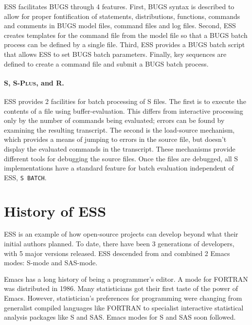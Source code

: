 \documentclass{article}
\newif\ifdraft
\newcommand*{\Splus}{\textsc{S-Plus}}
\newcommand{\stexttt}[1]{{\small\texttt{#1}}}
\newcommand{\emptyfig}{
\hspace*{42pt}\rule{324pt}{.25pt}\\
\hspace*{42pt}\rule{.25pt}{10pc}
\rule{316pt}{.25pt}
\rule{.25pt}{10pc}}
\begin{document}
ESS facilitates BUGS %
through 4 features.
First, BUGS syntax is described to allow for proper fontification
of statements, distributions, functions, commands and comments in BUGS
model files, command files and log files.  Second, ESS creates
templates for the command file from the model file so that a BUGS
batch process can be defined by a single file.  Third, ESS provides
a BUGS batch script that allows ESS to set BUGS batch parameters.
Finally, key sequences are defined to create a command file and submit 
a BUGS batch process.

\paragraph{S, \Splus, and R.}
ESS provides 2 facilities for batch processing of S files.  The first
is to execute the contents of a file using buffer-evaluation.  This
differs from interactive processing only by the number of commands
being evaluated; errors can be found by examining the resulting
transcript.  The second is the load-source mechanism, which provides a
means of jumping to errors in the source file, but doesn't display the
evaluated commands in the transcript.  These mechanisms provide
different tools for debugging the source files.  Once the files are
debugged, all S implementations have a standard feature for batch
evaluation independent of ESS, \stexttt{S BATCH}.

\section{History of ESS}
\label{sec:ESS:history}

ESS is an example of how open-source projects can develop beyond what
their initial authors planned.  To date, there have been 3 generations
of developers, with 5 major versions released.  ESS descended from and combined
2 Emacs modes: S-mode and SAS-mode.

Emacs has a long history of being a programmer's editor.  A mode for FORTRAN 
was distributed in 1986.  Many statisticians got their first taste of the power 
of Emacs.  However, statistician's preferences for programming were changing 
from generalist compiled languages like FORTRAN to specialist interactive 
statistical analysis packages like S and SAS.  Emacs modes for S and SAS soon 
followed.
\end{document}
